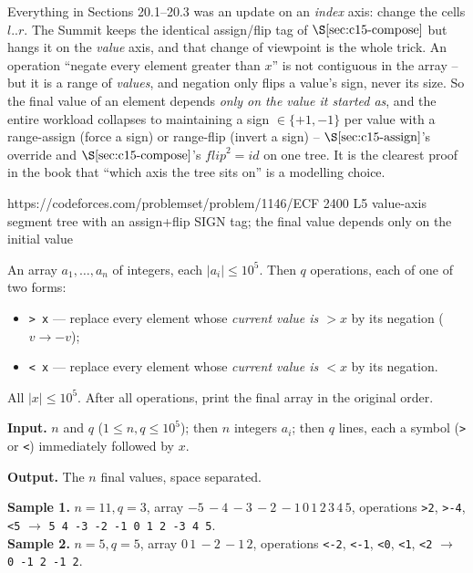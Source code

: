 
\begin{notebox}
Everything in Sections 20.1--20.3 was an update on an \emph{index} axis: change the cells
\(l..r\). The Summit keeps the identical assign/flip tag of \(\secref{c15-compose}\) but
hangs it on the \emph{value} axis, and that change of viewpoint is the whole trick. An
operation ``negate every element greater than \(x\)'' is not contiguous in the array -- but
it is a range of \emph{values}, and negation only flips a value's sign, never its size. So
the final value of an element depends \emph{only on the value it started as}, and the entire
workload collapses to maintaining a sign \(\in\{+1,-1\}\) per value with a range-assign
(force a sign) or range-flip (invert a sign) -- \(\secref{c15-assign}\)'s override and
\(\secref{c15-compose}\)'s \(\mathit{flip}^2{=}\mathit{id}\) on one tree. It is the clearest
proof in the book that ``which axis the tree sits on'' is a modelling choice.
\end{notebox}

  {https://codeforces.com/problemset/problem/1146/E}{CF 2400 L5}
  {value-axis segment tree with an assign+flip SIGN tag; the final value depends only on the initial value}

\begin{problemstatement}
An array \(a_1,\dots,a_n\) of integers, each \(|a_i|\le 10^{5}\). Then \(q\) operations,
each of one of two forms:
\begin{itemize}[nosep,leftmargin=1.4em]
  \item \texttt{> x} --- replace every element whose \emph{current value is \(>x\)} by its
        negation (\(v\to-v\));
  \item \texttt{< x} --- replace every element whose \emph{current value is \(<x\)} by its
        negation.
\end{itemize}
All \(|x|\le 10^{5}\). After all operations, print the final array in the original order.

\textbf{Input.} \(n\) and \(q\) (\(1\le n,q\le 10^{5}\)); then \(n\) integers \(a_i\);
then \(q\) lines, each a symbol (\texttt{>} or \texttt{<}) immediately followed by \(x\).

\textbf{Output.} The \(n\) final values, space separated.

\textbf{Sample 1.} \(n{=}11,q{=}3\), array \(-5\,-4\,-3\,-2\,-1\,0\,1\,2\,3\,4\,5\),
operations \texttt{>2}, \texttt{>-4}, \texttt{<5} \(\to\) \texttt{5 4 -3 -2 -1 0 1 2 -3 4 5}.\\
\textbf{Sample 2.} \(n{=}5,q{=}5\), array \(0\,1\,-2\,-1\,2\), operations
\texttt{<-2}, \texttt{<-1}, \texttt{<0}, \texttt{<1}, \texttt{<2} \(\to\) \texttt{0 -1 2 -1 2}.
\end{problemstatement}

